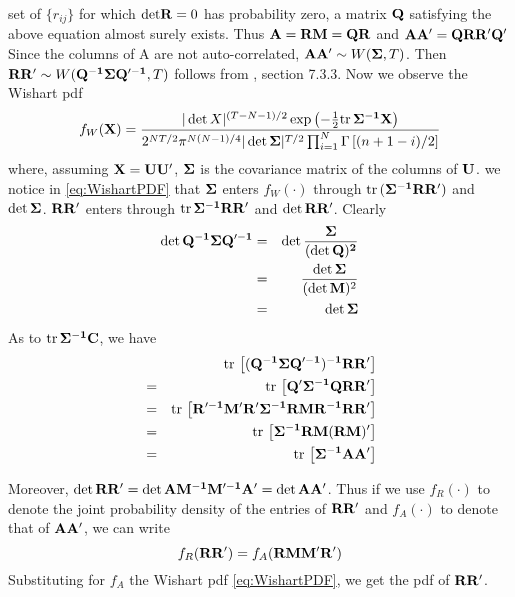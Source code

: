 set of $\{r_{ij}\}$ for which $\text{det} \mathbf{R} = 0$ has probability
zero, a matrix $\mathbf{Q}$ satisfying the above equation almost surely
exists. Thus $\mathbf{A} = \mathbf{RM} = \mathbf{QR}$ and $\mathbf{AA'} =
\mathbf{QRR'Q'}$ Since the columns of A are not auto-correlated, $\mathbf{AA'}
\sim W(\mathbf{\Sigma}, T)$. Then $\mathbf{RR'} \sim W(\mathbf{Q^{-1} \Sigma
  Q'^{-1}}, T)$ follows from \cite{Anderson2003}, section 7.3.3. Now we
observe the Wishart \gls{pdf}
\begin{equation}
  \label{eq:WishartPDF}
  f_W(\mathbf{X}) = { |\det X|^{(T-N-1)/2} \exp\left(-{1 \over 2}\text{tr}\,
      \mathbf{\Sigma^{-1}X} \right)
    \over
    2^{NT/2}\pi^{N(N-1)/4}|\det \mathbf{\Sigma}|^{T/2}
    \prod_{i=1}^N \Gamma\left[(n+1-i)/2\right]
  }
\end{equation}
where, assuming $\mathbf{X} = \mathbf{UU'}$, $\mathbf{\Sigma}$ is the covariance
matrix of the columns of $\mathbf{U}$. we notice in \ref{eq:WishartPDF}
that $\mathbf{\Sigma}$ enters $f_W(\cdot)$ through $\text{tr}\, (\mathbf{\Sigma^{-1}
  RR'})$ and $\det \mathbf{\Sigma}$. $\mathbf{RR'}$ enters through $\text{tr}\,
\mathbf{\Sigma^{-1} RR'}$ and $\det \mathbf{RR'}$. Clearly
\begin{eqnarray*}
  \det \mathbf{Q^{-1}\Sigma Q'^{-1}} &=& \det \mathbf{\Sigma \over (\det Q)^2} \\
  &=& \det \mathbf{\Sigma} \over (\det \mathbf{M})^2 \\
  &=& \det \mathbf{\Sigma}
\end{eqnarray*}
As to $\text{tr}\, \mathbf{\Sigma^{-1} C}$, we have
\begin{eqnarray*}
  && \text{tr}\,\left[\mathbf{(Q^{-1}\Sigma Q'^{-1})^{-1} RR'}\right] \\
  &=& \text{tr}\,\left[\mathbf{Q'\Sigma^{-1} Q RR'}\right] \\
  &=& \text{tr}\,\left[\mathbf{R'^{-1}M'R'\Sigma^{-1} RMR^{-1} RR'}\right] \\
  &=& \text{tr}\,\left[\mathbf{\Sigma^{-1} RM (RM)'}\right] \\
  &=& \text{tr}\,\left[\mathbf{\Sigma^{-1} AA'}\right] \\
\end{eqnarray*}

Moreover, $\det \mathbf{RR'} = \det \mathbf{AM^{-1} M'^{-1} A'} = \det
\mathbf{AA'}$. Thus if we use $f_R(\cdot)$ to denote the joint
probability density of the entries of $\mathbf{RR'}$ and $f_A(\cdot)$ to
denote that of $\mathbf{AA'}$, we can write
\begin{equation}\label{eq:cross-corr-matrix-PDF}
  f_R(\mathbf{RR'}) = f_A(\mathbf{RMM'R'})
\end{equation}
Substituting for $f_A$ the Wishart \gls{pdf} \ref{eq:WishartPDF}, we
get the \gls{pdf} of $\mathbf{RR'}$.

